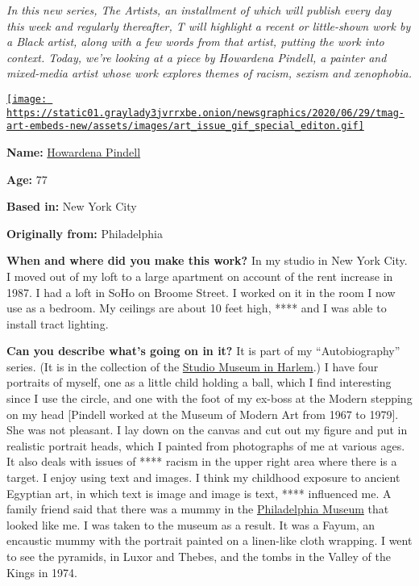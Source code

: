 \emph{In this new series, The Artists, an installment of which will
publish every day this week and regularly thereafter, T will highlight a
recent or little-shown work by a Black artist, along with a few words
from that artist, putting the work into context. Today, we're looking at
a piece by Howardena Pindell, a painter and mixed-media artist whose
work explores themes of racism, sexism and xenophobia.}

\href{https://www.nytimes3xbfgragh.onion/issue/t-magazine/2020/07/02/true-believers-art-issue}{\texttt{[image: https://static01.graylady3jvrrxbe.onion/newsgraphics/2020/06/29/tmag-art-embeds-new/assets/images/art\_issue\_gif\_special\_editon.gif]}}

\textbf{Name:} \href{https://www.howardenapindell.org/}{Howardena
Pindell}

\textbf{Age:} 77

\textbf{Based in:} New York City

\textbf{Originally from:} Philadelphia

\textbf{When and where did you make this work?} In my studio in New York
City. I moved out of my loft to a large apartment on account of the rent
increase in 1987. I had a loft in SoHo on Broome Street. I worked on it
in the room I now use as a bedroom. My ceilings are about 10 feet high,
**** and I was able to install tract lighting.

\textbf{Can you describe what's going on in it?} It is part of my
``Autobiography'' series. (It is in the collection of the
\href{https://www.nytimes3xbfgragh.onion/topic/organization/studio-museum-in-harlem}{Studio
Museum in Harlem}.) I have four portraits of myself, one as a little
child holding a ball, which I find interesting since I use the circle,
and one with the foot of my ex-boss at the Modern stepping on my head
{[}Pindell worked at the Museum of Modern Art from 1967 to 1979{]}. She
was not pleasant. I lay down on the canvas and cut out my figure and put
in realistic portrait heads, which I painted from photographs of me at
various ages. It also deals with issues of **** racism in the upper
right area where there is a target. I enjoy using text and images. I
think my childhood exposure to ancient Egyptian art, in which text is
image and image is text, **** influenced me. A family friend said that
there was a mummy in the
\href{https://www.nytimes3xbfgragh.onion/topic/organization/philadelphia-museum-of-art}{Philadelphia
Museum} that looked like me. I was taken to the museum as a result. It
was a Fayum, an encaustic mummy with the portrait painted on a
linen-like cloth wrapping. I went to see the pyramids, in Luxor and
Thebes, and the tombs in the Valley of the Kings in 1974.

